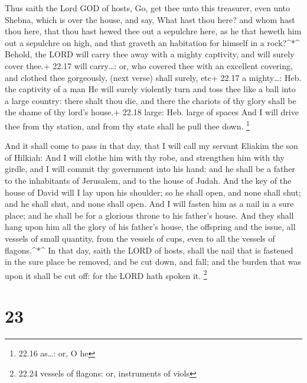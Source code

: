  Thus saith the Lord GOD of hosts, Go, get thee unto this
treasurer, even unto Shebna, which is over the house, and say,
 What hast thou here? and whom hast thou here, that thou
hast hewed thee out a sepulchre here, as he that heweth him out a
sepulchre on high, and that graveth an habitation for himself in a
rock?\^{}*\^{}  Behold, the LORD will carry thee away with
a mighty captivity, and will surely cover thee.+ 22.17 will carry\ldots:
or, who covered thee with an excellent covering, and clothed thee
gorgeously, (next verse) shall surely, etc+ 22.17 a mighty\ldots: Heb.
the captivity of a man  He will surely violently turn and
toss thee like a ball into a large country: there shalt thou die, and
there the chariots of thy glory shall be the shame of thy lord's house.+
22.18 large: Heb. large of spaces  And I will drive thee
from thy station, and from thy state shall he pull thee down.
\footnote{22.16 as\ldots: or, O he}

 And it shall come to pass in that day, that I will call my
servant Eliakim the son of Hilkiah:  And I will clothe him
with thy robe, and strengthen him with thy girdle, and I will commit thy
government into his hand: and he shall be a father to the inhabitants of
Jerusalem, and to the house of Judah.  And the key of the
house of David will I lay upon his shoulder; so he shall open, and none
shall shut; and he shall shut, and none shall open.  And I
will fasten him as a nail in a sure place; and he shall be for a
glorious throne to his father's house.  And they shall hang
upon him all the glory of his father's house, the offspring and the
issue, all vessels of small quantity, from the vessels of cups, even to
all the vessels of flagons.\^{}*\^{}  In that day, saith
the LORD of hosts, shall the nail that is fastened in the sure place be
removed, and be cut down, and fall; and the burden that was upon it
shall be cut off: for the LORD hath spoken it. \footnote{22.24 vessels
  of flagons: or, instruments of viols}

\hypertarget{section-22}{%
\section{23}\label{section-22}}

